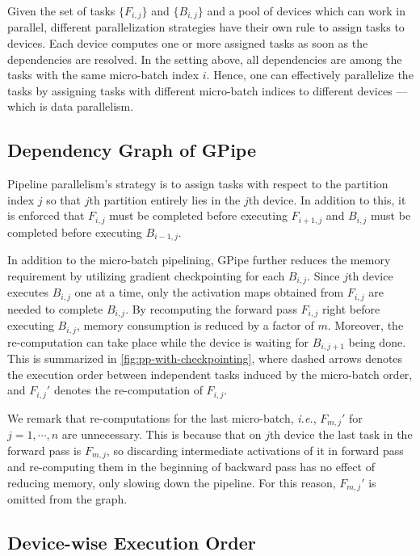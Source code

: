 Given the set of tasks $\{F_{i, j}\}$ and $\{B_{i, j}\}$ and a pool of devices which can work in parallel, different parallelization strategies have their own rule to assign tasks to devices. Each device computes one or more assigned tasks as soon as the dependencies are resolved. In the setting above, all dependencies are among the tasks with the same micro-batch index $i$. Hence, one can effectively parallelize the tasks by assigning tasks with different micro-batch indices to different devices --- which is data parallelism.

\subsection{Dependency Graph of GPipe}
\label{subsec:gpipe-dependency}

Pipeline parallelism's strategy is to assign tasks with respect to the partition index $j$ so that $j$th partition entirely lies in the $j$th device. In addition to this, it is enforced that $F_{i, j}$ must be completed before executing $F_{i+1, j}$ and $B_{i, j}$ must be completed before executing $B_{i-1, j}$. 

In addition to the micro-batch pipelining, GPipe \cite{huang2019gpipe} further reduces the memory requirement by utilizing gradient checkpointing for each $B_{i, j}$. Since $j$th device executes $B_{i,j}$ one at a time, only the activation maps obtained from $F_{i,j}$ are needed to complete $B_{i,j}$. By recomputing the forward pass $F_{i,j}$ right before executing $B_{i,j}$, memory consumption is reduced by a factor of $m$. Moreover, the re-computation can take place while the device is waiting for $B_{i,j+1}$ being done. This is summarized in \autoref{fig:pp-with-checkpointing}, where dashed arrows denotes the execution order between independent tasks induced by the micro-batch order, and $F_{i, j}'$ denotes the re-computation of $F_{i,j}$. 


We remark that re-computations for the last micro-batch, \emph{i.e.}, $F_{m, j}'$ for $j=1,\cdots,n$ are unnecessary. This is because that on $j$th device the last task in the forward pass is $F_{m, j}$, so discarding intermediate activations of it in forward pass and re-computing them in the beginning of backward pass has no effect of reducing memory, only slowing down the pipeline. For this reason, $F_{m, j}'$ is omitted from the graph.

\subsection{Device-wise Execution Order}
\label{subsec:timeline}

